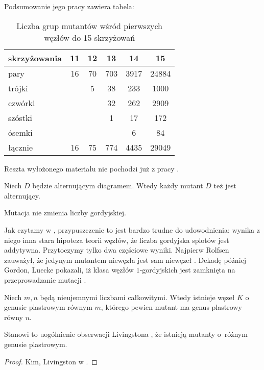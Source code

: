 Podsumowanie jego pracy zawiera tabela:

\begin{table}[h]
    \centering
    \begin{tabular}{lccccc} \toprule
        skrzyżowania & 11 & 12 & 13  & 14   & 15    \\ \midrule
        pary         & 16 & 70 & 703 & 3917 & 24884 \\
        trójki       &    & 5  & 38  & 233  & 1000  \\
        czwórki      &    &    & 32  & 262  & 2909  \\
        szóstki      &    &    & 1   & 17   & 172   \\
        ósemki       &    &    &     & 6    & 84    \\
        łącznie      & 16 & 75 & 774 & 4435 & 29049 \\
        \bottomrule
        \hline
    \end{tabular}
    \caption{Liczba grup mutantów wśród pierwszych węzłów do 15 skrzyżowań}
\end{table}

Reszta wyłożonego materiału nie pochodzi już z pracy \cite{stoimenow10}.

\begin{proposition}
    Niech $D$ będzie alternującym diagramem.
    Wtedy każdy mutant $D$ też jest alternujący.
\end{proposition}

\begin{conjecture}
    Mutacja nie zmienia liczby gordyjskiej.
\end{conjecture}

Jak czytamy w \cite[problem 1.69]{kirby78}, przypuszczenie to jest bardzo trudne do udowodnienia: wynika z niego inna stara hipoteza teorii węzłów, że liczba gordyjska splotów jest addytywna.
Przytoczymy tylko dwa częściowe wyniki.
Najpierw Rolfsen zauważył, że jedynym mutantem niewęzła jest sam niewęzeł \cite{rolfsen93}.
Dekadę później Gordon, Luecke pokazali, iż klasa węzłów $1$-gordyjskich jest zamknięta na przeprowadzanie mutacji \cite{gordon06}.

\begin{proposition}
    Niech $m, n$ będą nieujemnymi liczbami całkowitymi.
    Wtedy istnieje węzeł $K$ o genusie plastrowym równym $m$, którego pewien mutant ma genus plastrowy równy $n$.
\end{proposition}

Stanowi to uogólnienie obserwacji Livingstona \cite{livingston83}, że istnieją mutanty o~różnym genusie plastrowym.

\begin{proof}
    Kim, Livingston w \cite{kim05}.
\end{proof}

